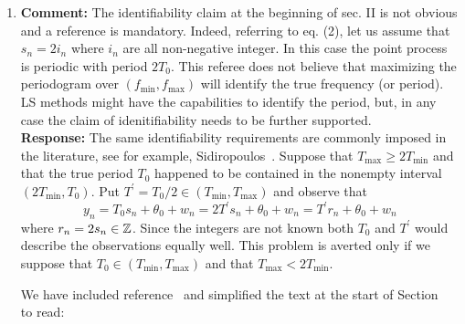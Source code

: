 \documentclass[a4paper,10pt]{article}
\begin{document}
\begin{enumerate}

\item\textbf{Comment:}
 The identifiability claim at the beginning of sec. II is not obvious and a reference is mandatory. Indeed, referring to eq. (2), let us assume that $s_n = 2 i_n$ where $i_n$ are all non-negative integer. In this case the point process is periodic with period $2 T_0$. This referee does not believe that maximizing the periodogram over $(f_{\text{min}},f_{\text{max}})$ will identify the true frequency (or period). LS methods might have the capabilities to identify the period, but, in any case the claim of idenitifiability needs to be further supported.
\\
\textbf{Response:} The same identifiability requirements are commonly imposed in the literature, see for example, Sidiropoulos~\cite[eq. (2)]{Sidiropoulos2005}.  Suppose that $T_{\text{max}} \geq 2T_{\text{min}}$ and that the true period $T_0$ happened to be contained in the nonempty interval $(2T_{\text{min}}, T_0)$.  Put $T^\prime = T_0/2 \in (T_{\text{min}}, T_{\text{max}})$ and observe that
\[
y_n = T_0 s_n + \theta_0 + w_n = 2 T^\prime s_n + \theta_0 + w_n = T^\prime r_n + \theta_0 + w_n 
\]
where $r_n = 2 s_n \in {\mathbb Z}$.  Since the integers are not known both $T_0$ and $T^\prime$ would describe the observations equally well.  This problem is averted only if we suppose that $T_0 \in (T_{\text{min}}, T_{\text{max}})$ and that  $T_{\text{max}} < 2T_{\text{min}}$.



We have included reference~\cite{Sidiropoulos2005} and simplified the text at the start of Section~ to read:


\end{enumerate}
\end{document}
